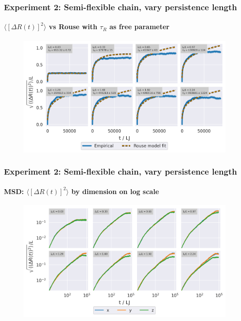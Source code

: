 \documentclass[handout]{beamer}
\newcommand{\mean}[1]{\langle #1 \rangle}
\begin{document}
\begin{frame}
    \frametitle{Experiment 2: Semi-flexible chain, vary persistence length}
    \framesubtitle{$\mean{[\Delta R(t)]^2}$ vs Rouse with $\tau_R$ as free parameter}

    \begin{figure}[h]
        \includegraphics[width=11cm]{./4-exp-delta_R-rouse_fit-tau.png}
    \end{figure}
\end{frame}

\begin{frame}
    \frametitle{Experiment 2: Semi-flexible chain, vary persistence length}
    \framesubtitle{MSD: $\mean{[\Delta R(t)]^2}$ by dimension on log scale}

    \begin{figure}[h]
        \includegraphics[width=11cm]{./4-exp-msd_by_dim-log.png}
    \end{figure}
\end{frame}

\end{document}
